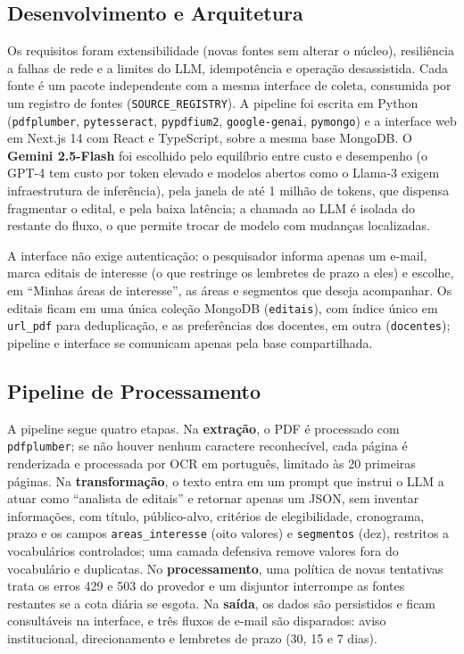 \documentclass[12pt]{article}
\begin{document}
  \subsection{Desenvolvimento e Arquitetura}\label{sec:arquitetura-do-sistema}
  Os requisitos foram extensibilidade (novas fontes sem alterar o núcleo), resiliência a falhas de rede e a limites do LLM, idempotência e operação desassistida. Cada fonte é um pacote independente com a mesma interface de coleta, consumida por um registro de fontes (\texttt{SOURCE\_REGISTRY}). A pipeline foi escrita em Python (\texttt{pdfplumber}, \texttt{pytesseract}, \texttt{pypdfium2}, \texttt{google-genai}, \texttt{pymongo}) e a interface web em Next.js 14 com React e TypeScript, sobre a mesma base MongoDB. O \textbf{Gemini 2.5-Flash} foi escolhido pelo equilíbrio entre custo e desempenho (o GPT-4 tem custo por token elevado e modelos abertos como o Llama-3 exigem infraestrutura de inferência), pela janela de até 1 milhão de tokens, que dispensa fragmentar o edital, e pela baixa latência; a chamada ao LLM é isolada do restante do fluxo, o que permite trocar de modelo com mudanças localizadas.

  A interface não exige autenticação: o pesquisador informa apenas um e-mail, marca editais de interesse (o que restringe os lembretes de prazo a eles) e escolhe, em ``Minhas áreas de interesse'', as áreas e segmentos que deseja acompanhar. Os editais ficam em uma única coleção MongoDB (\texttt{editais}), com índice único em \texttt{url\_pdf} para deduplicação, e as preferências dos docentes, em outra (\texttt{docentes}); pipeline e interface se comunicam apenas pela base compartilhada.

  \subsection{Pipeline de Processamento}\label{sec:pipeline-de-processamento}
  A pipeline segue quatro etapas. Na \textbf{extração}, o PDF é processado com \texttt{pdfplumber}; se não houver nenhum caractere reconhecível, cada página é renderizada e processada por OCR em português, limitado às 20 primeiras páginas. Na \textbf{transformação}, o texto entra em um prompt que instrui o LLM a atuar como ``analista de editais'' e retornar apenas um JSON, sem inventar informações, com título, público-alvo, critérios de elegibilidade, cronograma, prazo e os campos \texttt{areas\_interesse} (oito valores) e \texttt{segmentos} (dez), restritos a vocabulários controlados; uma camada defensiva remove valores fora do vocabulário e duplicatas. No \textbf{processamento}, uma política de novas tentativas trata os erros 429 e 503 do provedor e um disjuntor interrompe as fontes restantes se a cota diária se esgota. Na \textbf{saída}, os dados são persistidos e ficam consultáveis na interface, e três fluxos de e-mail são disparados: aviso institucional, direcionamento e lembretes de prazo (30, 15 e 7 dias).
\end{document}
